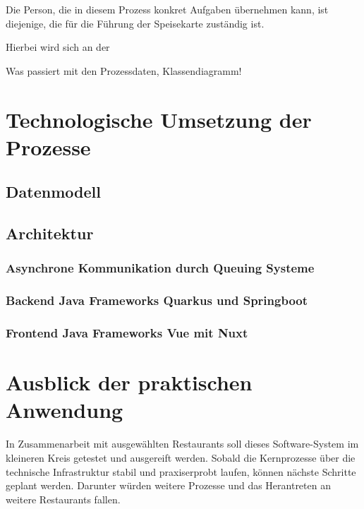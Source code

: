 Die Person, die in diesem Prozess konkret Aufgaben übernehmen kann, ist diejenige, die für die Führung der Speisekarte zuständig ist.

\clearpage
{}

Hierbei wird sich an der 

Was passiert mit den Prozessdaten,  Klassendiagramm!

\section{Technologische Umsetzung der Prozesse}
\label{sec:technologie_prozesse}
\subsection{Datenmodell}
\label{sec:datenmodell}

\subsection{Architektur}

\subsubsection{Asynchrone Kommunikation durch Queuing Systeme}
\subsubsection{Backend Java Frameworks Quarkus und Springboot}
\subsubsection{Frontend Java Frameworks Vue mit Nuxt}

\section{Ausblick der praktischen Anwendung}
\label{sec:zukunft}

In Zusammenarbeit mit ausgewählten Restaurants soll dieses Software-System im kleineren Kreis getestet und ausgereift werden. Sobald die Kernprozesse über die technische Infrastruktur stabil und praxiserprobt laufen, können nächste Schritte geplant werden. Darunter würden weitere Prozesse und das Herantreten an weitere Restaurants fallen. 


